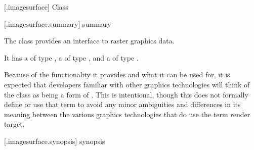  [\iotwod.imagesurface] {Class }

 [\iotwod.imagesurface.summary] { summary}

\pnum
{}%
The class  provides an interface to raster graphics data.

\pnum
It has a  of type , a  of type , and a  of type .

\pnum
\begin{note}
Because of the functionality it provides and what it can be used for, it is expected that developers familiar with other graphics technologies will think of the  class as being a form of . This is intentional, though this \documenttypename{} does not formally define or use that term to avoid any minor ambiguities and differences in its meaning between the various graphics technologies that do use the term render target.
\end{note}

 [\iotwod.imagesurface.synopsis] { synopsis}

